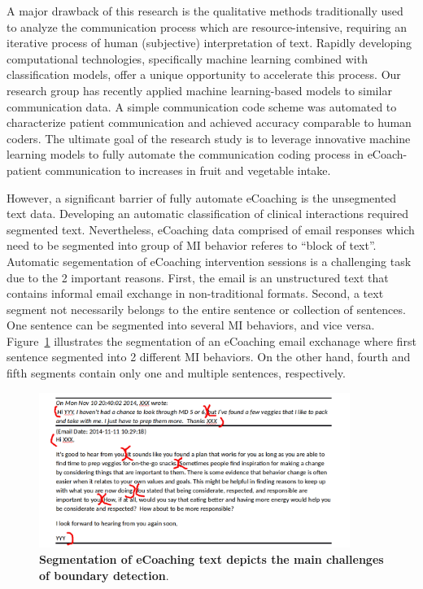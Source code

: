 \documentclass{amia}
\begin{document}
A major drawback of this research is the qualitative methods traditionally used to analyze the communication process which are resource-intensive, requiring an iterative process of human (subjective) interpretation of text. Rapidly developing computational technologies, specifically machine learning combined with classification models, offer a unique opportunity to accelerate this process. Our research group has recently applied machine learning-based models to similar communication data\cite{hasan2016study,kotov2015interpretable}. A simple communication code scheme was automated to characterize patient communication and achieved accuracy comparable to human coders\cite{hasan2016study}. The ultimate goal of the research study is to leverage innovative machine learning models to fully automate the communication coding process in eCoach-patient communication to increases in fruit and vegetable intake. 

However, a significant barrier of fully automate eCoaching is the unsegmented text data. Developing an automatic classification of clinical interactions required segmented text. Nevertheless, eCoaching data comprised of email responses which need to be segmented into group of MI behavior referes to ``block of text''. Automatic segementation of eCoaching intervention sessions is a challenging task due to the 2 important reasons. First, the email is an unstructured text that contains informal email exchange in non-traditional formats. Second, a text segment not necessarily belongs to the entire sentence or collection of sentences. One sentence can be segmented into several MI behaviors, and vice versa. Figure~\ref{fig:text-segment} illustrates the segmentation of an eCoaching email exchanage where first sentence segmented into 2 different MI behaviors. On the other hand, fourth and fifth segments contain only one and multiple sentences, respectively.  

\begin{figure}[!htb]
    \centering
    \includegraphics[width=0.9\textwidth]{figures/segment-example.png}
    \caption{\textbf{Segmentation of eCoaching text depicts the main challenges of boundary detection}.}
    \label{fig:text-segment}
\end{figure}
\end{document}
